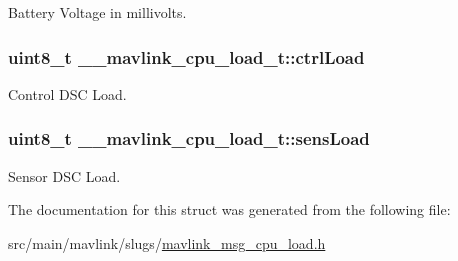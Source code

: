 Battery Voltage in millivolts. 

\hypertarget{struct____mavlink__cpu__load__t_a2e999c8df746bb5ab55ca5ed6e5c701b}{
\subsubsection[{ctrl\+Load}]{\setlength{\rightskip}{0pt plus 5cm}uint8\+\_\+t \+\_\+\+\_\+mavlink\+\_\+cpu\+\_\+load\+\_\+t\+::ctrl\+Load}}\label{struct____mavlink__cpu__load__t_a2e999c8df746bb5ab55ca5ed6e5c701b}


Control D\+S\+C Load. 

\hypertarget{struct____mavlink__cpu__load__t_a57abf05fe0f75189ca7963c38419a006}{
\subsubsection[{sens\+Load}]{\setlength{\rightskip}{0pt plus 5cm}uint8\+\_\+t \+\_\+\+\_\+mavlink\+\_\+cpu\+\_\+load\+\_\+t\+::sens\+Load}}\label{struct____mavlink__cpu__load__t_a57abf05fe0f75189ca7963c38419a006}


Sensor D\+S\+C Load. 



The documentation for this struct was generated from the following file\+:\begin{DoxyCompactItemize}
\item 
src/main/mavlink/slugs/\hyperlink{mavlink__msg__cpu__load_8h}{mavlink\+\_\+msg\+\_\+cpu\+\_\+load.\+h}\end{DoxyCompactItemize}
